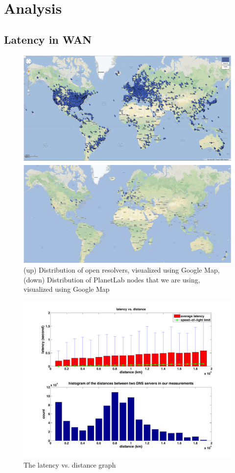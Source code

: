 \section{Analysis}
\label{sec:analysis}

\subsection{Latency in WAN}
\label{sec:latency-wan-1}

\begin{figure}
  \centering
  \includegraphics[width=\linewidth]{../figs/geo_viz.pdf}
  \caption{(up) Distribution of open resolvers, visualized using Google Map, (down) Distribution of PlanetLab nodes that we are using, visualized using Google Map}
  \label{fig:geo_viz}
\end{figure}

\begin{figure}
  \centering
  \includegraphics[width=\linewidth]{../figs/latency_dist.pdf}
  \caption{The latency vs. distance graph}
  \label{fig:latency_dist}
\end{figure}

